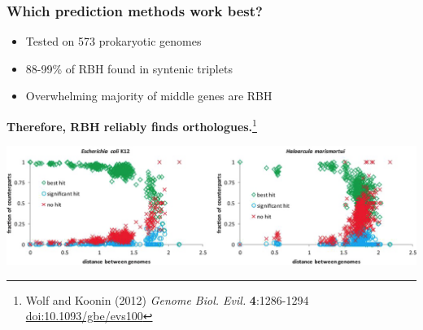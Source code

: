 \begin{frame}
  \frametitle{Which prediction methods work best?}
  \begin{itemize}
    \item Tested on 573 prokaryotic genomes
    \item 88-99\% of RBH found in syntenic triplets
    \item Overwhelming majority of middle genes are RBH
  \end{itemize}
  \textbf{Therefore, RBH reliably finds orthologues.}\footnote{\tiny{Wolf and Koonin (2012) \textit{Genome Biol. Evil.} \textbf{4}:1286-1294 \href{http://dx.doi.org/10.1093/gbe/evs100}{doi:10.1093/gbe/evs100}}}
  \begin{center}
      \includegraphics[width=1\textwidth]{images/syntenic_triplet_results} 
  \end{center}
\end{frame}

